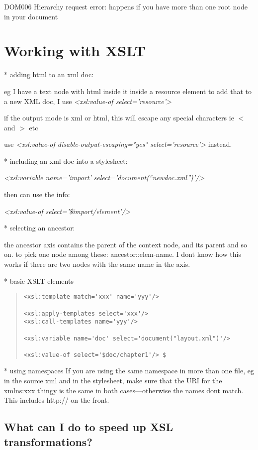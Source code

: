 \documentclass[a4paper,11pt]{article}
\begin{document}
DOM006 Hierarchy request error: happens if you have more than one root node in your document

\section{Working with XSLT}

* adding html to an xml doc:

eg I have a text node with html inside it inside a resource element
to add that to a new XML doc, I use
{\em <xsl:value-of select='resource'>\/}

if the output mode is xml or html, this will escape any special characters
ie $<$ and $>$ etc

use
{\em <xsl:value-of disable-output-escaping="yes" select='resource'>\/}
instead.

* including an xml doc into a stylesheet:

{\em <xsl:variable name='import' select='document(``newdoc.xml'')'/>\/}

then can use the info:

{\em <xsl:value-of select='\$import/element'/>\/}

* selecting an ancestor:

 the ancestor axis contains the parent of the context node, and its
 parent and so on. to pick one node among these:
 ancestor::elem-name. I dont know how this works if there are two
 nodes with the same name in the axis.

* basic XSLT elements
\begin{quote}\begin{footnotesize}\begin{verbatim}
<xsl:template match='xxx' name='yyy'/>

<xsl:apply-templates select='xxx'/>
<xsl:call-templates name='yyy'/>

<xsl:variable name='doc' select='document("layout.xml")'/>

<xsl:value-of select='$doc/chapter1'/> $
\end{verbatim}\end{footnotesize}\end{quote}

* using namespaces
If you are using the same namespace in more than one file, eg in the source xml and in the stylesheet, make sure that the URI for the xmlns:xxx thingy is the same in both cases---otherwise the names dont match. This includes http:// on the front.

\subsection{What can I do to speed up XSL transformations?}
\end{document}

